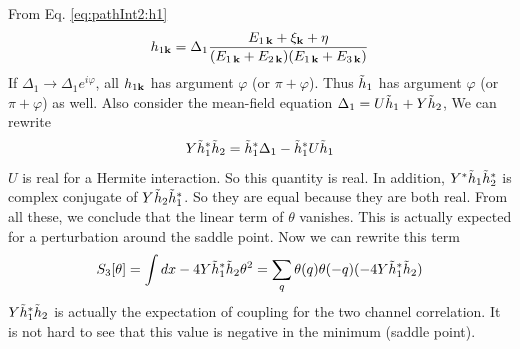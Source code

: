 From Eq. \ref{eq:pathInt2:h1}
\begin{equation*}
 h_{1\mathbf{k}}=\Delta_{1}\frac{E_{1\,\mathbf{k}}+\xi_{\mathbf{k}}+\eta}{(E_{1\,\mathbf{k}}+E_{2\,\mathbf{k}})(E_{1\,\mathbf{k}}+E_{3\,\mathbf{k}})}
\end{equation*}
If $\Delta_{1}\to\Delta_{1}e^{i\varphi}$, all $h_{1\mathbf{k}}$ has argument $\varphi$ (or $\pi+\varphi$). Thus $\tilde{h}_{1}$ has argument $\varphi$ (or $\pi+\varphi$) as well.  Also consider the mean-field equation  $\Delta_{1}=U\tilde{h}_{1}+Y\tilde{h}_{2}$, We can rewrite 
\begin{equation}
Y\tilde{h}_{1}^{*}\tilde{h}_{2}=\tilde{h}_{1}^{*}\Delta_{1}-\tilde{h}_{1}^{*}U\tilde{h}_{1}
\end{equation}
$U$ is real for a Hermite interaction.  So this quantity is real.  In addition,  $Y^{*}\tilde{h}_{1}\tilde{h}_{2}^{*}$ is complex conjugate of $Y^{}\tilde{h}_{2}\tilde{h}_{1}^{*}$. So they are equal because they are both real.  From all these, we conclude that the linear term of $\theta$ vanishes.  This is actually expected for a perturbation around the saddle point.  Now we can rewrite this term
\begin{equation}
S_{3}[\theta]=\int{dx}-4Y\tilde{h}_{1}^{*}\tilde{h}_{2}\theta^{2}=\sum_{q}\theta({q})\theta({-q})(-4Y\tilde{h}_{1}^{*}\tilde{h}_{2})
\end{equation}
$Y\tilde{h}_{1}^{*}\tilde{h}_{2}$ is actually the expectation of coupling for the two channel correlation.  It is not hard to see that this value  is negative in the minimum (saddle point).  

